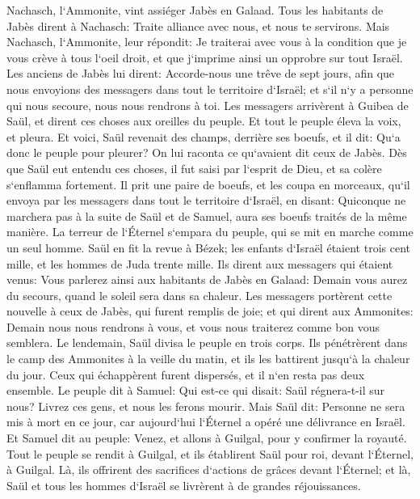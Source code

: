 \verse Nachasch, l`Ammonite, vint assiéger Jabès en Galaad. Tous les habitants de Jabès dirent à Nachasch: Traite alliance avec nous, et nous te servirons. 
\verse Mais Nachasch, l`Ammonite, leur répondit: Je traiterai avec vous à la condition que je vous crève à tous l`oeil droit, et que j`imprime ainsi un opprobre sur tout Israël. 
\verse Les anciens de Jabès lui dirent: Accorde-nous une trêve de sept jours, afin que nous envoyions des messagers dans tout le territoire d`Israël; et s`il n`y a personne qui nous secoure, nous nous rendrons à toi. 
\verse Les messagers arrivèrent à Guibea de Saül, et dirent ces choses aux oreilles du peuple. Et tout le peuple éleva la voix, et pleura. 
\verse Et voici, Saül revenait des champs, derrière ses boeufs, et il dit: Qu`a donc le peuple pour pleurer? On lui raconta ce qu`avaient dit ceux de Jabès. 
\verse Dès que Saül eut entendu ces choses, il fut saisi par l`esprit de Dieu, et sa colère s`enflamma fortement. 
\verse Il prit une paire de boeufs, et les coupa en morceaux, qu`il envoya par les messagers dans tout le territoire d`Israël, en disant: Quiconque ne marchera pas à la suite de Saül et de Samuel, aura ses boeufs traités de la même manière. La terreur de l`Éternel s`empara du peuple, qui se mit en marche comme un seul homme. 
\verse Saül en fit la revue à Bézek; les enfants d`Israël étaient trois cent mille, et les hommes de Juda trente mille. 
\verse Ils dirent aux messagers qui étaient venus: Vous parlerez ainsi aux habitants de Jabès en Galaad: Demain vous aurez du secours, quand le soleil sera dans sa chaleur. Les messagers portèrent cette nouvelle à ceux de Jabès, qui furent remplis de joie; 
\verse et qui dirent aux Ammonites: Demain nous nous rendrons à vous, et vous nous traiterez comme bon vous semblera. 
\verse Le lendemain, Saül divisa le peuple en trois corps. Ils pénétrèrent dans le camp des Ammonites à la veille du matin, et ils les battirent jusqu`à la chaleur du jour. Ceux qui échappèrent furent dispersés, et il n`en resta pas deux ensemble. 
\verse Le peuple dit à Samuel: Qui est-ce qui disait: Saül régnera-t-il sur nous? Livrez ces gens, et nous les ferons mourir. 
\verse Mais Saül dit: Personne ne sera mis à mort en ce jour, car aujourd`hui l`Éternel a opéré une délivrance en Israël. 
\verse Et Samuel dit au peuple: Venez, et allons à Guilgal, pour y confirmer la royauté. 
\verse Tout le peuple se rendit à Guilgal, et ils établirent Saül pour roi, devant l`Éternel, à Guilgal. Là, ils offrirent des sacrifices d`actions de grâces devant l`Éternel; et là, Saül et tous les hommes d`Israël se livrèrent à de grandes réjouissances. 

